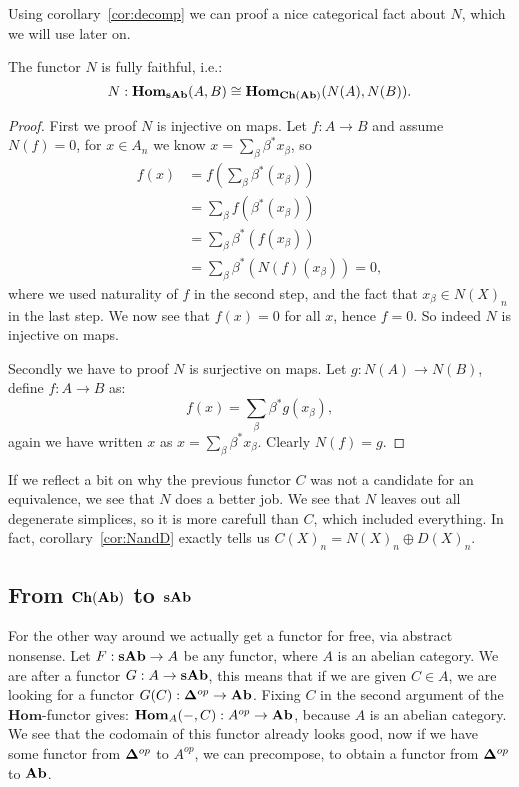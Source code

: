 Using corollary~\ref{cor:decomp} we can proof a nice categorical fact about $N$, which we will use later on. 
\begin{lemma}
	The functor $N$ is fully faithful, i.e.:
	$$ N : \mathbf{Hom}_{\mathbf{sAb}}(A, B) \cong \mathbf{Hom}_{\mathbf{Ch}(\mathbf{Ab})}(N(A), N(B)). $$
\end{lemma}
\begin{proof}
	First we proof $N$ is injective on maps. Let $f: A \to B$ and assume $N(f) = 0$, for $x \in A_n$ we know $x = \sum_\beta \beta^\ast x_\beta$, so
	\begin{align*}
		f(x) &= \textstyle f(\sum_\beta \beta^\ast (x_\beta)) \\
			&= \textstyle \sum_\beta f(\beta^\ast (x_\beta)) \\ 
			&= \textstyle \sum_\beta \beta^\ast (f (x_\beta)) \\ 
			&= \textstyle \sum_\beta \beta^\ast (N(f) (x_\beta)) = 0,	
	\end{align*}
	where we used naturality of $f$ in the second step, and the fact that $x_\beta \in N(X)_n$ in the last step. We now see that $f(x) = 0$ for all $x$, hence $f = 0$. So indeed $N$ is injective on maps.

	Secondly we have to proof $N$ is surjective on maps. Let $g : N(A) \to N(B)$, define $f : A \to B$ as:
	$$ f(x) = \sum_\beta \beta^\ast g(x_\beta), $$
	again we have written $x$ as $x = \sum_\beta \beta^\ast x_\beta$. Clearly $N(f) = g$. 
\end{proof}

If we reflect a bit on why the previous functor $C$ was not a candidate for an equivalence, we see that $N$ does a better job. We see that $N$ leaves out all degenerate simplices, so it is more carefull than $C$, which included everything. In fact, corollary~\ref{cor:NandD} exactly tells us $C(X)_n = N(X)_n \oplus D(X)_n$.

\subsection{From $\mathbf{Ch}(\mathbf{Ab})$ to $\mathbf{sAb}$}
For the other way around we actually get a functor for free, via abstract nonsense. Let $F : \mathbf{sAb} \to A$ be any functor, where $A$ is an abelian category. We are after a functor $G : A \to \mathbf{sAb}$, this means that if we are given $C \in A$, we are looking for a functor $G(C) : \mathbf{\Delta}^{op} \to \mathbf{Ab}$. Fixing $C$ in the second argument of the $\mathbf{Hom}$-functor gives: $\mathbf{Hom}_{A}(-, C) : A^{op} \to \mathbf{Ab}$, because $A$ is an abelian category. We see that the codomain of this functor already looks good, now if we have some functor from $\mathbf{\Delta}^{op}$ to $A^{op}$, we can precompose, to obtain a functor from $\mathbf{\Delta}^{op}$ to $\mathbf{Ab}$.

